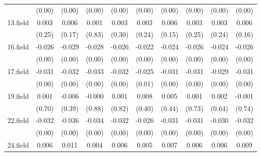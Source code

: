 {\begin{tabular}{l*{9}{c}}
          &   (0.00)         &   (0.00)         &   (0.00)         &   (0.00)         &   (0.00)         &   (0.00)         &   (0.00)         &   (0.00)         &   (0.00)         \\
[1em]
13.field  &    0.003         &    0.006         &    0.001         &    0.003         &    0.003         &    0.006         &    0.003         &    0.003         &    0.006         \\
          &   (0.25)         &   (0.17)         &   (0.83)         &   (0.30)         &   (0.24)         &   (0.15)         &   (0.25)         &   (0.24)         &   (0.16)         \\
[1em]
16.field  &   -0.026\sym{***}&   -0.029\sym{***}&   -0.028\sym{***}&   -0.026\sym{***}&   -0.022\sym{***}&   -0.024\sym{***}&   -0.026\sym{***}&   -0.024\sym{***}&   -0.026\sym{***}\\
          &   (0.00)         &   (0.00)         &   (0.00)         &   (0.00)         &   (0.00)         &   (0.00)         &   (0.00)         &   (0.00)         &   (0.00)         \\
[1em]
17.field  &   -0.031\sym{***}&   -0.032\sym{***}&   -0.033\sym{***}&   -0.032\sym{***}&   -0.025\sym{**} &   -0.031\sym{***}&   -0.031\sym{***}&   -0.029\sym{***}&   -0.031\sym{***}\\
          &   (0.00)         &   (0.00)         &   (0.00)         &   (0.00)         &   (0.01)         &   (0.00)         &   (0.00)         &   (0.00)         &   (0.00)         \\
[1em]
19.field  &    0.001         &   -0.006         &   -0.000         &    0.001         &    0.008         &    0.005         &    0.001         &    0.002         &   -0.001         \\
          &   (0.70)         &   (0.39)         &   (0.88)         &   (0.82)         &   (0.40)         &   (0.44)         &   (0.73)         &   (0.64)         &   (0.74)         \\
[1em]
22.field  &   -0.032\sym{***}&   -0.036\sym{***}&   -0.034\sym{***}&   -0.032\sym{***}&   -0.026\sym{***}&   -0.031\sym{***}&   -0.031\sym{***}&   -0.030\sym{***}&   -0.032\sym{***}\\
          &   (0.00)         &   (0.00)         &   (0.00)         &   (0.00)         &   (0.00)         &   (0.00)         &   (0.00)         &   (0.00)         &   (0.00)         \\
[1em]
24.field  &    0.006\sym{*}  &    0.011         &    0.004         &    0.006\sym{*}  &    0.005\sym{*}  &    0.007\sym{*}  &    0.006\sym{*}  &    0.006\sym{*}  &    0.009\sym{*}  \\

\end{tabular}}
